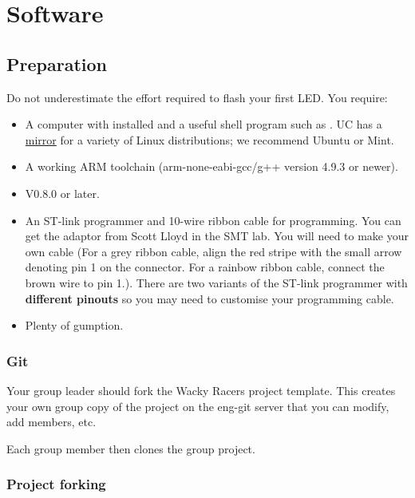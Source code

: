 \label{software}
\chapter{Software}



\section{Preparation}
\label{preparation}

Do not underestimate the effort required to flash your first LED. You
require:

\begin{itemize}
\item
  A computer with  installed and a useful shell program such as
  . UC has a \href{http://ucmirror.canterbury.ac.nz/}{mirror}
  for a variety of Linux distributions; we recommend Ubuntu or Mint.
\item
  A working ARM toolchain (arm-none-eabi-gcc/g++ version 4.9.3 or newer).
\item
   V0.8.0 or later.
\item
  An ST-link programmer and 10-wire ribbon cable for programming. You
  can get the adaptor from Scott Lloyd in the SMT lab. You will need
  to make your own cable (For a grey ribbon cable, align the red
  stripe with the small arrow denoting pin 1 on the connector. For a
  rainbow ribbon cable, connect the brown wire to pin 1.). There are
  two variants of the ST-link programmer with \textbf{different
    pinouts} so you may need to customise your programming cable.
\item
  Plenty of gumption.
\end{itemize}


\subsection{Git}

Your group leader should fork the Wacky Racers project template.  This
creates your own group copy of the project on the eng-git server that
you can modify, add members, etc.

Each group member then clones the group project.


\subsection{Project forking}
\label{project-forking}

